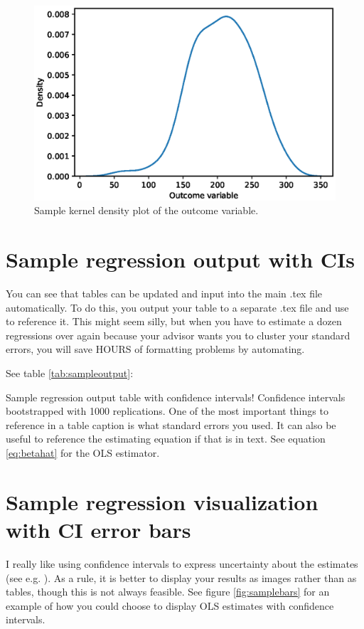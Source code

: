 \documentclass{article}
\begin{document}
\begin{figure}[ht]
    \centering
    \includegraphics[scale = 0.7]{samplehist.eps}
    \caption{Sample kernel density plot of the outcome variable.}
    \label{fig:samplehist}
\end{figure}

\section{Sample regression output with CIs}
You can see that tables can be updated and input into the main .tex file automatically.  To do this, you output your table to a separate .tex file and use \verb!  ! to reference it.  This might seem silly, but when you have to estimate a dozen regressions over again because your advisor wants you to cluster your standard errors, you will save HOURS of formatting problems by automating.

See table \ref{tab:sampleoutput}:

\begin{table}[ht]
    \centering
    
    \caption{Sample regression output table with confidence intervals! Confidence intervals bootstrapped with 1000 replications.  One of the most important things to reference in a table caption is what standard errors you used.  It can also be useful to reference the estimating equation if that is in text. See equation \ref{eq:betahat} for the OLS estimator.}
    \label{tab:sampleoutput}
\end{table}

\section{Sample regression visualization with CI error bars}
I really like using confidence intervals to express uncertainty about the estimates (see e.g. \citealp{zm2009}).  As a rule, it is better to display your results as images rather than as tables, though this is not always feasible. See figure \ref{fig:samplebars} for an example of how you could choose to display OLS estimates with confidence intervals.
\end{document}
